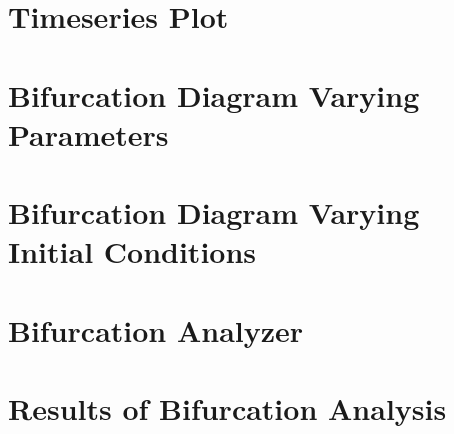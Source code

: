 \section{Timeseries Plot}

\section{Bifurcation Diagram Varying Parameters}

\section{Bifurcation Diagram Varying Initial Conditions}

\section{Bifurcation Analyzer}\label{bifurcation_analyzer}

\section{Results of Bifurcation Analysis}\label{bifurcation_analysis}

